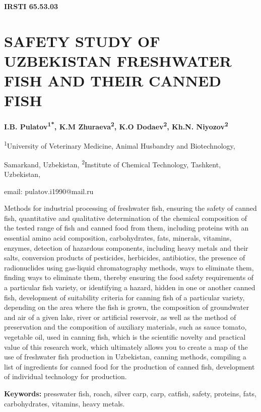 \clearpage
{\bfseries IRSTI 65.53.03}

\section{SAFETY STUDY OF UZBEKISTAN FRESHWATER FISH AND THEIR CANNED FISH}

\begin{center}
{\bfseries I.B. Pulatov\textsuperscript{1*}, K.M
Zhuraeva\textsuperscript{2}, K.O Dodaev\textsuperscript{2}, Kh.N.
Niyozov\textsuperscript{2}}

\textsuperscript{1}University of Veterinary Medicine, Animal Husbandry
and Biotechnology,

Samarkand, Uzbekistan, \textsuperscript{2}Institute of Chemical
Technology, Tashkent, Uzbekistan,

email: pulatov.i1990@mail.ru
\end{center}

Methods for industrial processing of freshwater fish, ensuring the
safety of canned fish, quantitative and qualitative determination of the
chemical composition of the tested range of fish and canned food from
them, including proteins with an essential amino acid composition,
carbohydrates, fats, minerals, vitamins, enzymes, detection of hazardous
components, including heavy metals and their salts, conversion products
of pesticides, herbicides, antibiotics, the presence of radionuclides
using gas-liquid chromatography methods, ways to eliminate them, finding
ways to eliminate them, thereby ensuring the food safety requirements of
a particular fish variety, or identifying a hazard, hidden in one or
another canned fish, development of suitability criteria for canning
fish of a particular variety, depending on the area where the fish is
grown, the composition of groundwater and air of a given lake, river or
artificial reservoir, as well as the method of preservation and the
composition of auxiliary materials, such as sauce tomato, vegetable oil,
used in canning fish, which is the scientific novelty and practical
value of this research work, which ultimately allows you to create a map
of the use of freshwater fish production in Uzbekistan, canning methods,
compiling a list of ingredients for canned food for the production of
canned fish, development of individual technology for production.

{\bfseries Keywords:} presswater fish, roach, silver carp, carp, catfish,
safety, proteins, fats, carbohydrates, vitamins, heavy metals.

